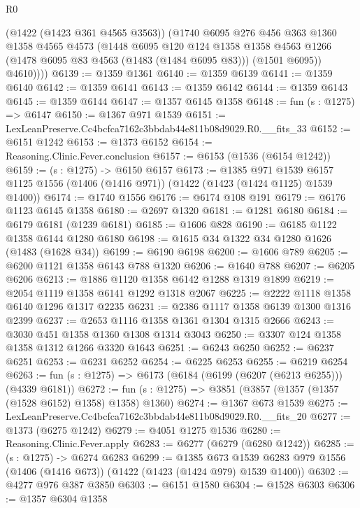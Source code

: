 \begin{lexlean}{R0}
\begin{coremodule}
          (@1422 (@1423 @361 @4565 @3563))
          (@1740
            @6095
            @276
            @456
            @363
            @1360
            @1358
            @4565
            @4573
            (@1448
              @6095
              @120
              @124
              @1358
              @1358
              @4563
              @1266
              (@1478 @6095 @83 @4563 (@1483 (@1484 @6095 @83)))
              (@1501 @6095))
            @4610))))
@6139 := @1359 @1361
@6140 := @1359 @6139
@6141 := @1359 @6140
@6142 := @1359 @6141
@6143 := @1359 @6142
@6144 := @1359 @6143
@6145 := @1359 @6144
@6147 := @1357 @6145 @1358
@6148 := fun (s : @1275) => @6147
@6150 := @1367 @971 @1539
@6151 := LexLeanPreserve.Cc4bcfca7162c3bbdab44e811b08d9029.R0.__fits_33
@6152 := @6151 @1242
@6153 := @1373 @6152
@6154 := Reasoning.Clinic.Fever.conclusion
@6157 := @6153 (@1536 (@6154 @1242))
@6159 := (s : @1275) -> @6150 @6157
@6173 := @1385
    @971
    @1539
    @6157
    @1125
    @1556
    (@1406 (@1416 @971))
    (@1422 (@1423 (@1424 @1125) @1539 @1400))
@6174 := @1740 @1556
@6176 := @6174 @108 @191
@6179 := @6176 @1123 @6145 @1358
@6180 := @2697 @1320
@6181 := @1281 @6180
@6184 := @6179 @6181 (@1239 @6181)
@6185 := @1606 @828
@6190 := @6185 @1122 @1358 @6144 @1280 @6180
@6198 := @1615 @34 @1322 @34 @1280 @1626 (@1483 (@1628 @34))
@6199 := @6190 @6198
@6200 := @1606 @789
@6205 := @6200 @1121 @1358 @6143 @788 @1320
@6206 := @1640 @788
@6207 := @6205 @6206
@6213 := @1886 @1120 @1358 @6142 @1288 @1319 @1899
@6219 := @2054 @1119 @1358 @6141 @1292 @1318 @2067
@6225 := @2222 @1118 @1358 @6140 @1296 @1317 @2235
@6231 := @2386 @1117 @1358 @6139 @1300 @1316 @2399
@6237 := @2653 @1116 @1358 @1361 @1304 @1315 @2666
@6243 := @3030 @451 @1358 @1360 @1308 @1314 @3043
@6250 := @3307 @124 @1358 @1358 @1312 @1266 @3320 @1643
@6251 := @6243 @6250
@6252 := @6237 @6251
@6253 := @6231 @6252
@6254 := @6225 @6253
@6255 := @6219 @6254
@6263 := fun (s : @1275) => @6173 (@6184 (@6199 (@6207 (@6213 @6255))) (@4339 @6181))
@6272 := fun (s : @1275) => @3851 (@3857 (@1357 (@1357 (@1528 @6152) @1358) @1358) @1360)
@6274 := @1367 @673 @1539
@6275 := LexLeanPreserve.Cc4bcfca7162c3bbdab44e811b08d9029.R0.__fits_20
@6277 := @1373 (@6275 @1242)
@6279 := @4051 @1275 @1536
@6280 := Reasoning.Clinic.Fever.apply
@6283 := @6277 (@6279 (@6280 @1242))
@6285 := (s : @1275) -> @6274 @6283
@6299 := @1385
    @673
    @1539
    @6283
    @979
    @1556
    (@1406 (@1416 @673))
    (@1422 (@1423 (@1424 @979) @1539 @1400))
@6302 := @4277 @976 @387 @3850
@6303 := @6151 @1580
@6304 := @1528 @6303
@6306 := @1357 @6304 @1358

\end{coremodule}
\end{lexlean}
